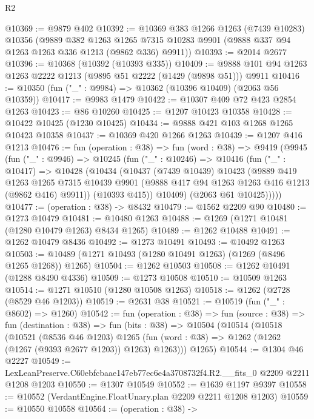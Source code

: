 \begin{lexlean}{R2}
\begin{coremodule}
@10369 := @9879 @402
@10392 := @10369
    @383
    @1266
    @1263
    (@7439 @10283)
    @10356
    (@9889
      @382
      @1263
      @1265
      @7315
      @10283
      @9901
      (@9888 @337 @94 @1263 @1263 @336 @1213 (@9862 @336) @9911))
@10393 := @2014 @2677
@10396 := @10368 (@10392 (@10393 @335))
@10409 := @9888 @101 @94 @1263 @1263 @2222 @1213 (@9895 @51 @2222 (@1429 (@9898 @51))) @9911
@10416 := @10350 (fun ("_" : @9984) => @10362 (@10396 @10409) (@2063 @56 @10359))
@10417 := @9983 @1479
@10422 := @10307 @409 @72 @423 @2854 @1263
@10423 := @86 @10260
@10425 := @1207 @10423 @10358
@10428 := @10422 @10425 (@1230 @10425)
@10434 := @9888 @421 @103 @1268 @1265 @10423 @10358
@10437 := @10369 @420 @1266 @1263
@10439 := @1207 @416 @1213
@10476 := fun (operation : @38) =>
  fun (word : @38) =>
  @9419
    (@9945
      (fun ("_" : @9946) =>
      @10245
        (fun ("_" : @10246) =>
        @10416
          (fun ("_" : @10417) =>
          @10428
            (@10434
              (@10437
                (@7439 @10439)
                @10423
                (@9889
                  @419
                  @1263
                  @1265
                  @7315
                  @10439
                  @9901
                  (@9888 @417 @94 @1263 @1263 @416 @1213 (@9862 @416) @9911))
                (@10393 @415))
              @10409)
            (@2063 @61 @10425)))))
@10477 := (operation : @38) -> @8432
@10479 := @1562 @2209 @90
@10480 := @1273 @10479
@10481 := @10480 @1263
@10488 := @1269 (@1271 @10481 (@1280 @10479 @1263) @8434 @1265)
@10489 := @1262 @10488
@10491 := @1262 @10479 @8436
@10492 := @1273 @10491
@10493 := @10492 @1263
@10503 := @10489 (@1271 @10493 (@1280 @10491 @1263) (@1269 (@8496 @1265 @1268)) @1265)
@10504 := @1262 @10503
@10508 := @1262 @10491 (@1288 @8490 @4336)
@10509 := @1273 @10508
@10510 := @10509 @1263
@10514 := @1271 @10510 (@1280 @10508 @1263)
@10518 := @1262 (@2728 (@8529 @46 @1203))
@10519 := @2631 @38
@10521 := @10519 (fun ("_" : @8602) => @1260)
@10542 := fun (operation : @38) =>
  fun (source : @38) =>
  fun (destination : @38) =>
  fun (bits : @38) =>
  @10504
    (@10514
      (@10518
        (@10521
          (@8536 @46 @1203)
          @1265
          (fun (word : @38) => @1262 (@1262 (@1267 (@9393 @2677 @1203)) @1263) @1263)))
      @1265)
@10544 := @1304 @46 @2227
@10549 := LexLeanPreserve.C60ebfcbaae147eb77ec6e4a3708732f4.R2.__fits_0 @2209 @2211 @1208 @1203
@10550 := @1307 @10549
@10552 := @1639 @1197 @9397
@10558 := @10552 (VerdantEngine.FloatUnary.plan @2209 @2211 @1208 @1203)
@10559 := @10550 @10558
@10564 := (operation : @38) ->

\end{coremodule}
\end{lexlean}
